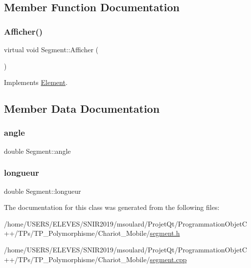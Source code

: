 \subsection{Member Function Documentation}
\mbox{\label{class_segment_a79c645f8ecf90ffa5818aa211e0f29d2}} 
\subsubsection{\texorpdfstring{Afficher()}{Afficher()}}
{\footnotesize\ttfamily virtual void Segment\+::\+Afficher (\begin{DoxyParamCaption}{ }\end{DoxyParamCaption})\hspace{0.3cm}{\ttfamily [virtual]}}



Implements \hyperlink{class_element_aa6fe26841512814e1e838c14c692daf0}{Element}.



\subsection{Member Data Documentation}
\mbox{\label{class_segment_a58f4b5a7f3c0a1038d10e778f3684b20}} 
\subsubsection{\texorpdfstring{angle}{angle}}
{\footnotesize\ttfamily double Segment\+::angle\hspace{0.3cm}{\ttfamily [private]}}

\mbox{\label{class_segment_a89584eea5e0b7c9d3fe5bcddf437f358}} 
\subsubsection{\texorpdfstring{longueur}{longueur}}
{\footnotesize\ttfamily double Segment\+::longueur\hspace{0.3cm}{\ttfamily [private]}}



The documentation for this class was generated from the following files\+:\begin{DoxyCompactItemize}
\item 
/home/\+U\+S\+E\+R\+S/\+E\+L\+E\+V\+E\+S/\+S\+N\+I\+R2019/msoulard/\+Projet\+Qt/\+Programmation\+Objet\+C++/\+T\+Ps/\+T\+P\+\_\+\+Polymorphisme/\+Chariot\+\_\+\+Mobile/\hyperlink{segment_8h}{segment.\+h}\item 
/home/\+U\+S\+E\+R\+S/\+E\+L\+E\+V\+E\+S/\+S\+N\+I\+R2019/msoulard/\+Projet\+Qt/\+Programmation\+Objet\+C++/\+T\+Ps/\+T\+P\+\_\+\+Polymorphisme/\+Chariot\+\_\+\+Mobile/\hyperlink{segment_8cpp}{segment.\+cpp}\end{DoxyCompactItemize}
